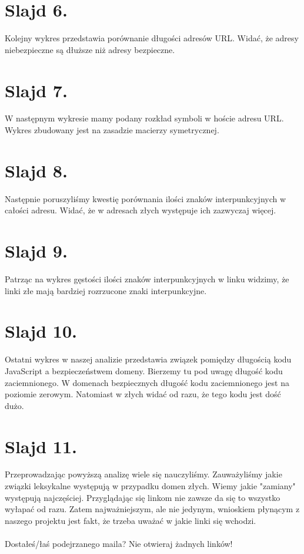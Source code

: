 \documentclass{article}
\begin{document}
\section{Slajd 6.}
{
	Kolejny wykres przedstawia porównanie długości adresów URL. Widać, że adresy niebezpieczne są dłuższe niż adresy bezpieczne.
}
\section{Slajd 7.}
{
	W następnym wykresie mamy podany rozkład symboli w hoście adresu URL. Wykres zbudowany jest na zasadzie macierzy symetrycznej.
}
\section{Slajd 8.}
{
	Następnie poruszyliśmy kwestię porównania ilości znaków interpunkcyjnych w całości adresu. Widać, że w adresach złych występuje ich zazwyczaj więcej.
}
\section{Slajd 9.}
{
	Patrząc na wykres gęstości ilości znaków interpunkcyjnych w linku widzimy, że linki złe mają bardziej rozrzucone znaki interpunkcyjne.
}
\section{Slajd 10.}
{
	Ostatni wykres w naszej analizie przedstawia związek pomiędzy długością kodu JavaScript a bezpieczeństwem domeny. Bierzemy tu pod uwagę długość kodu zaciemnionego. W domenach bezpiecznych długość kodu zaciemnionego jest na poziomie zerowym. Natomiast w złych widać od razu, że tego kodu jest dość dużo.
}
\section{Slajd 11.}
{
	Przeprowadzając powyższą analizę wiele się nauczyliśmy. Zauważyliśmy jakie związki leksykalne występują w przypadku domen złych. Wiemy jakie "zamiany" występują najczęściej. Przyglądając się linkom nie zawsze da się to wszystko wyłapać od razu. Zatem najważniejszym, ale nie jedynym, wnioskiem płynącym z naszego projektu jest fakt, że trzeba uważać w jakie linki się wchodzi.\\
	~\\
	Dostałeś/łaś podejrzanego maila? Nie otwieraj żadnych linków!
}
\end{document}
